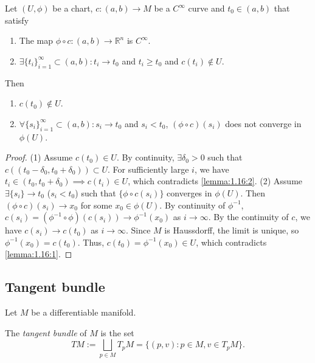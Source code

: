 \begin{lemma}\label{lemma:1.16}
Let $(U,\phi)$ be a chart, $c:(a,b) \to M$ be a $C^{\infty}$ curve and $t_0 \in (a,b)$ that satisfy 
\begin{enumerate}
    \item The map $\phi \circ c: (a,b) \to \mathbb{R}^n$ is $C^{\infty}$.
    \item $\exists \{t_i\}_{i=1}^{\infty} \subset (a,b) : t_i \to t_0$ and $t_i \geq t_0$ and $c(t_i) \notin U$.
\end{enumerate}
Then
\begin{enumerate}[label=(\roman*), ref=Lemma \thelemma~(\roman*)]
    \item \label{lemma:1.16:1}$c(t_0) \notin U$.
    \item $\forall \{s_i\}_{i=1}^{\infty} \subset (a,b) : s_i \to t_0$ and $s_i < t_0$, $(\phi \circ c)(s_i)$ does not converge in $\phi(U)$.
    \label{lemma:1.16:2}
\end{enumerate}
\end{lemma}

\begin{proof}
(1) Assume $c(t_0) \in U$. 
By continuity, $\exists \delta_0 > 0$ such that $c((t_0 - \delta_0, t_0 + \delta_0)) \subset U$.
For sufficiently large $i$, we have $t_i \in (t_0, t_0 + \delta_0) \implies c(t_i) \in U$, which contradicts \ref{lemma:1.16:2}.
(2) Assume $\exists \{s_i\} \to t_0$ ($s_i < t_0$) such that $\{\phi \circ c(s_i)\}$ converges in $\phi(U)$.
Then $(\phi \circ c)(s_i) \to x_0$ for some $x_0 \in \phi(U)$. By continuity of $\phi^{-1}$,
$c(s_i) = (\phi^{-1} \circ \phi)(c(s_i)) \to \phi^{-1}(x_0)$ as $i \to \infty$. By the continuity of $c$, we have $c(s_i) \to c(t_0)$ as $i \to \infty$. 
Since $M$ is Haussdorff, the limit is unique, so $\phi^{-1}(x_0) = c(t_0)$. Thus, $c(t_0) = \phi^{-1}(x_0) \in U$, which contradicts \ref{lemma:1.16:1}.
\end{proof}

\subsection{Tangent bundle}

Let $M$ be a differentiable manifold.

\begin{definition}
The \emph{tangent bundle} of $M$ is the set
\[TM := \bigsqcup_{p \in M} T_pM = \{(p,v) : p \in M, v \in T_pM\}.\]
\end{definition}

